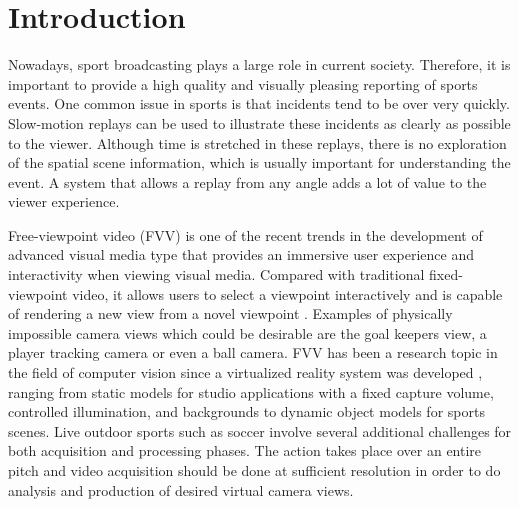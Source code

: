 \section{Introduction}
Nowadays, sport broadcasting plays a large role in current society.
Therefore, it is important to provide a high quality and visually pleasing reporting of sports events.
One common issue in sports is that incidents tend to be over very quickly.
Slow-motion replays can be used to illustrate these incidents as clearly as possible to the viewer. 
Although time is stretched in these replays, there is no exploration of the spatial scene information, which is 
usually important for understanding the event.
A system that allows a replay from any angle adds a lot of value to the viewer experience.



Free-viewpoint video (FVV) is one of the recent trends in the development of advanced visual media type
that provides an immersive user experience and interactivity when viewing
visual media. Compared with traditional fixed-viewpoint
video, it allows users to select a viewpoint interactively and
is capable of rendering a new view from a novel viewpoint \cite{05_plane_sweeping}.
Examples of physically impossible camera views which
could be desirable are the goal keepers view, a player tracking camera or even a
ball camera.
FVV has been a research topic in the field of computer vision 
since a virtualized reality system was developed \cite{04_fast_FVV_01},
ranging from static models for studio applications with a fixed
capture volume, controlled illumination, and backgrounds \cite{02_iview} 
to dynamic object models for sports scenes.
Live outdoor sports such as soccer involve several additional challenges for both acquisition and processing 
phases. 
The action takes place over an entire pitch and video acquisition should be done at sufficient resolution in order to
do analysis and production of desired virtual camera views.

